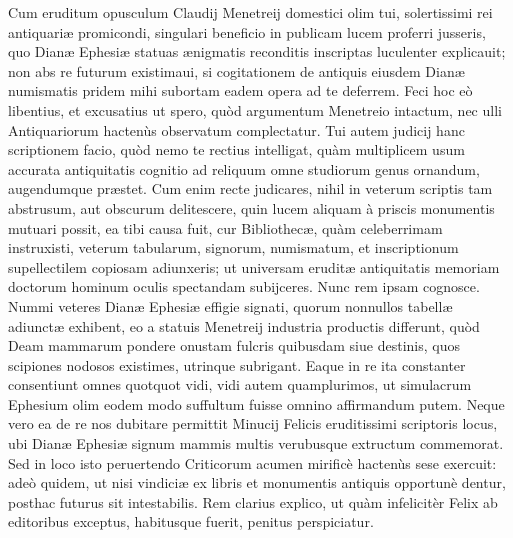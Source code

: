 \documentclass[a4paper, 11pt, oneside, polutonikogreek, latin]{article}
\begin{document}
Cum eruditum opusculum Claudij Menetreij domestici olim tui, solertissimi rei antiquariæ promicondi, singulari beneficio in publicam lucem proferri jusseris, quo Dianæ Ephesiæ statuas ænigmatis reconditis inscriptas luculenter explicauit; non abs re futurum existimaui, si cogitationem de antiquis eiusdem Dianæ numismatis pridem mihi subortam eadem opera ad te deferrem. Feci hoc eò libentius, et excusatius ut spero, quòd argumentum Menetreio intactum, nec ulli Antiquariorum hactenùs observatum complectatur. Tui autem judicij hanc scriptionem facio, quòd nemo te rectius intelligat, quàm multiplicem usum accurata antiquitatis cognitio ad reliquum omne studiorum genus ornandum, augendumque præstet. Cum enim recte judicares, nihil in veterum scriptis tam abstrusum, aut obscurum delitescere, quin lucem aliquam à priscis monumentis mutuari possit, ea tibi causa fuit, cur Bibliothecæ, quàm celeberrimam instruxisti, veterum tabularum, signorum, numismatum, et inscriptionum supellectilem copiosam adiunxeris; ut universam eruditæ antiquitatis memoriam doctorum hominum oculis spectandam subijceres. Nunc rem ipsam cognosce. Nummi veteres Dianæ Ephesiæ effigie signati, quorum nonnullos tabellæ adiunctæ exhibent, eo a statuis Menetreij industria productis differunt, quòd Deam mammarum pondere onustam fulcris quibusdam siue destinis, quos scipiones nodosos existimes, utrinque subrigant. Eaque in re ita constanter consentiunt omnes quotquot vidi, vidi autem quamplurimos, ut simulacrum Ephesium olim eodem modo suffultum fuisse omnino affirmandum putem. Neque vero ea de re nos dubitare permittit Minucij Felicis eruditissimi scriptoris locus, ubi Dianæ Ephesiæ signum mammis multis verubusque extructum commemorat. Sed in loco isto peruertendo Criticorum acumen mirificè hactenùs sese exercuit: adeò quidem, ut nisi vindiciæ ex libris et monumentis antiquis opportunè dentur, posthac futurus sit intestabilis. Rem clarius explico, ut quàm infelicitèr Felix ab editoribus exceptus, habitusque fuerit, penitus perspiciatur.
\end{document}
